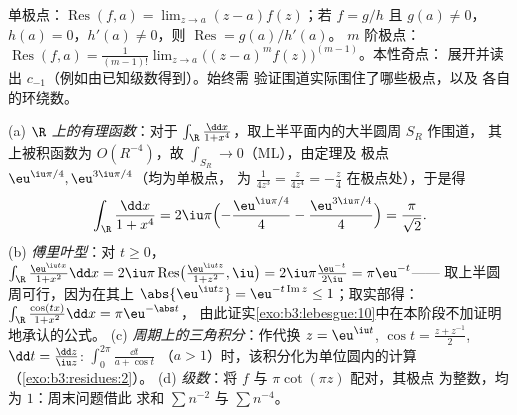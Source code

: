 \begin{method}[留数的计算]\label{met:b3:residues:compute}
单极点：$\operatorname{Res}(f, a) = \lim_{z\to a}(z -
a)f(z)$；若 $f = g/h$ 且 $g(a) \neq 0$，$h(a) = 0$，$h'(a)
\neq 0$，则 $\operatorname{Res} = g(a)/h'(a)$。
$m$ 阶极点：$\operatorname{Res}(f, a) = \frac1{(m-1)!}\lim_{z\to
a}\bigl((z-a)^mf(z)\bigr)^{(m-1)}$。本性奇点：
展开并读出 $c_{-1}$（例如由已知级数得到）。始终需
验证围道实际围住了哪些极点，以及
各自的环绕数。
\end{method}

\begin{example}[四类经典积分]
\label{ex:b3:residues:integrals}
(a) \emph{$\R$ 上的有理函数}：对于 $\int_\R\frac{\dd x}{1 +
x^4}$，取上半平面内的大半圆周 $S_R$ 作围道，
其上被积函数为 $O(R^{-4})$，故
$\int_{S_R} \to 0$（ML），由定理及
极点 $\eu^{\iu\pi/4}, \eu^{3\iu\pi/4}$（均为单极点，
为 $\frac1{4z^3} = \frac{z}{4z^4} = -\frac z4$ 在极点处），于是得
\[
\int_\R\frac{\dd x}{1 + x^4}
= 2\iu\pi\Bigl(-\frac{\eu^{\iu\pi/4}}4 -
\frac{\eu^{3\iu\pi/4}}4\Bigr)
= \frac{\pi}{\sqrt2} .
\]
(b) \emph{傅里叶型}：对 $t \geq 0$，
$\int_\R\frac{\eu^{\iu tx}}{1 + x^2}\dd x =
2\iu\pi\operatorname{Res}\bigl(\tfrac{\eu^{\iu tz}}{1+z^2},
\iu\bigr) = 2\iu\pi\frac{\eu^{-t}}{2\iu} = \pi\eu^{-t}$——
取上半圆周可行，因为在其上 $\abs{\eu^{\iu tz}} =
\eu^{-t\operatorname{Im}z} \leq 1$；取实部得：
$\int_\R\frac{\cos(tx)}{1+x^2}\dd x = \pi\eu^{-\abs t}$，
由此证实\cref{exo:b3:lebesgue:10}中在本阶段不加证明地承认的公式。
(c) \emph{周期上的三角积分}：作代换 $z =
\eu^{\iu t}$, $\cos t = \frac{z + z^{-1}}2$, $\dd t =
\frac{\dd z}{\iu z}$: $\int_0^{2\pi}\frac{\dd t}{a + \cos t}$
（$a > 1$）时，该积分化为单位圆内的计算
（\cref{exo:b3:residues:2}）。
(d) \emph{级数}：将 $f$ 与 $\pi\cot(\pi z)$ 配对，其极点
为整数，均为 $1$：周末问题借此
求和 $\sum n^{-2}$ 与 $\sum n^{-4}$。
\end{example}

